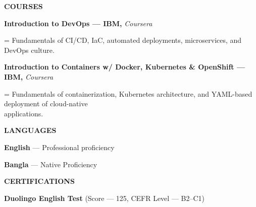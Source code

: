 \documentclass[a4paper]{article}
\newcommand{\sectionfont}{%
  \fontsize{12pt}{14pt}\selectfont\bfseries
}
\newlength{\secondaryindent}
\newcommand{\sectiontitle}[1]{%
  \par
  \vspace{14pt}
  {\sectionfont #1}\par
  \vspace{6pt}
}
\newcommand{\secondaryline}[1]{%
  \par
  \begingroup
  \leftskip=\secondaryindent
  \noindent
  #1\par
  \endgroup
}
\newcommand{\course}[2]{%
  \textbf{#1 --- IBM, }\textit{Coursera}\par
  \secondaryline{#2}%
}
\begin{document}

\sectiontitle{COURSES}

\course
{Introduction to DevOps}
{Fundamentals of CI/CD, IaC, automated deployments, microservices, and DevOps culture.}

\vspace{6pt}

\course
{Introduction to Containers w/ Docker, Kubernetes \& OpenShift}
{Fundamentals of containerization, Kubernetes architecture, and YAML-based deployment of cloud-native\\
  applications.}


\sectiontitle{LANGUAGES}

\textbf{English} --- Professional proficiency\par

\textbf{Bangla} --- Native Proficiency\par


\sectiontitle{CERTIFICATIONS}

\textbf{Duolingo English Test}
(Score --- 125, CEFR Level --- B2--C1)
\end{document}
